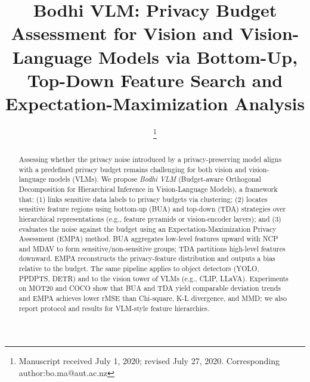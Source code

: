 \documentclass[journal]{IEEEtran}
\begin{document}
\title{Bodhi VLM: Privacy Budget Assessment for Vision and Vision-Language Models via Bottom-Up, Top-Down Feature Search and Expectation-Maximization Analysis}

\author{

\thanks{Manuscript received July 1, 2020; revised July 27, 2020.
Corresponding author:bo.ma@aut.ac.nz}
}

\maketitle

\begin{abstract}
Assessing whether the privacy noise introduced by a privacy-preserving model aligns with a predefined privacy budget remains challenging for both vision and vision-language models (VLMs). We propose \emph{Bodhi VLM} (Budget-aware Orthogonal Decomposition for Hierarchical Inference in Vision-Language Models), a framework that: (1) links sensitive data labels to privacy budgets via clustering; (2) locates sensitive feature regions using bottom-up (BUA) and top-down (TDA) strategies over hierarchical representations (e.g., feature pyramids or vision-encoder layers); and (3) evaluates the noise against the budget using an Expectation-Maximization Privacy Assessment (EMPA) method. BUA aggregates low-level features upward with NCP and MDAV to form sensitive/non-sensitive groups; TDA partitions high-level features downward. EMPA reconstructs the privacy-feature distribution and outputs a bias relative to the budget. The same pipeline applies to object detectors (YOLO, PPDPTS, DETR) and to the vision tower of VLMs (e.g., CLIP, LLaVA). Experiments on MOT20 and COCO show that BUA and TDA yield comparable deviation trends and EMPA achieves lower rMSE than Chi-square, K-L divergence, and MMD; we also report protocol and results for VLM-style feature hierarchies.
\end{abstract}
\end{document}
